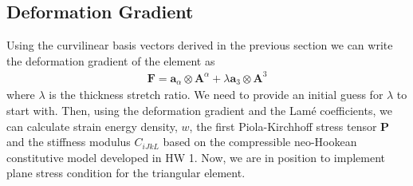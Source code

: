 \documentclass[../main.tex]{subfiles}
\begin{document}
\subsection{Deformation Gradient}
Using the curvilinear basis vectors derived in the previous section we
can write the deformation gradient of the element as
\begin{align*}
  \mathbf{F} = \mathbf{a}_\alpha\otimes \mathbf{A}^{\alpha} + \lambda \mathbf{a}_3\otimes \mathbf{A}^3
\end{align*}
where $\lambda$ is the thickness stretch ratio. We need to provide an
initial guess for $\lambda$ to start with. Then, using the deformation
gradient and the Lam\'{e} coefficients, we can calculate strain energy
density, $w$, the first Piola-Kirchhoff stress tensor $\mathbf{P}$ and
the stiffness modulus $C_{iJkL}$ based on the compressible neo-Hookean
constitutive model developed in HW 1. Now, we are in position to
implement plane stress condition for the triangular element.
\end{document}
